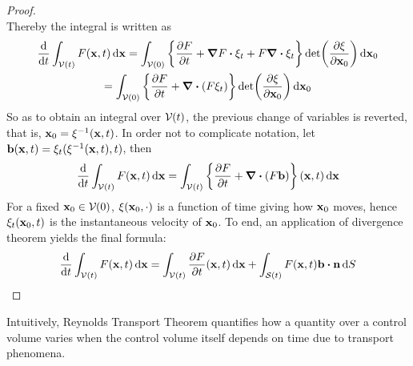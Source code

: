 \begin{proof}
\begin{equation*}
	\end{equation*}
	Thereby the integral is written as
	\begin{multline*}
		\frac{\dd}{\dd{t}} \int_\cvt F(\vb{x}, t) \dd{\vb{x}} = 
		\int_{\cv{}(0)} 
		\left\{
		\frac{\partial F}{\partial t} + \grad{F} \vdot \xi_t + F \div{\xi_t}
		\right\} \det(\frac{\partial \xi}{\partial \vb{x}_0}) \dd{\vb{x}_0} 
		\\ = 
		\int_{\cv{}(0)} 
		\left\{	\frac{\partial F}{\partial t} + \div(F \xi_t) \right\} \det(\frac{\partial \xi}{\partial \vb{x}_0}) \dd{\vb{x}_0}
	\end{multline*}
	So as to obtain an integral over $\mathcal{V}_{}(t)$, the previous change of variables is reverted, that is, $\vb{x}_0 = \xi^{-1}(\vb{x}, t)$. In order not to complicate notation, let $\vb{b}(\vb{x},t) = \xi_t(\xi^{-1}(\vb{x},t),t)$, then
	\begin{equation*}
		\frac{\dd}{\dd{t}} \int_{\mathcal{V}(t)} F(\vb{x}, t) \dd{\vb{x}} = 
		\int_{\mathcal{V}(t)} 
		\left\{ \frac{\partial F}{\partial t}  + \div(F \vb{b}) \right\} (\vb{x}, t) \dd{\vb{x}}
	\end{equation*}
	For a fixed $\vb{x}_0 \in \mathcal{V}_{}(0)$, $\xi(\vb{x}_0, \cdot)$ is a function of time giving how $\vb{x}_0$ moves, hence $\xi_t(\vb{x}_0, t)$ is the instantaneous velocity of $\vb{x}_0$. To end, an application of divergence theorem yields the final formula:
	\begin{equation*}
		\frac{\dd}{\dd{t}} \int_\cvt F(\vb{x}, t) \dd{\vb{x}} = 
		\int_\cvt \frac{\partial F}{\partial t} (\vb{x}, t) \dd{\vb{x}} +
		\int_\cst F(\vb{x}, t) \vb{b} \vdot \vb{n} \dd{S}
	\end{equation*}
\end{proof}

Intuitively, Reynolds Transport Theorem quantifies how a quantity over a control volume varies when the control volume itself depends on time due to transport phenomena.






